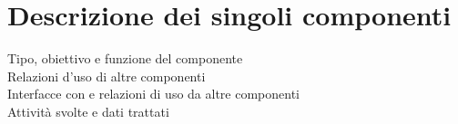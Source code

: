 \section{Descrizione dei singoli componenti}
	Tipo, obiettivo e funzione del componente \\
	Relazioni d'uso di altre componenti \\
	Interfacce con e relazioni di uso da altre componenti \\
	Attività svolte e dati trattati \\